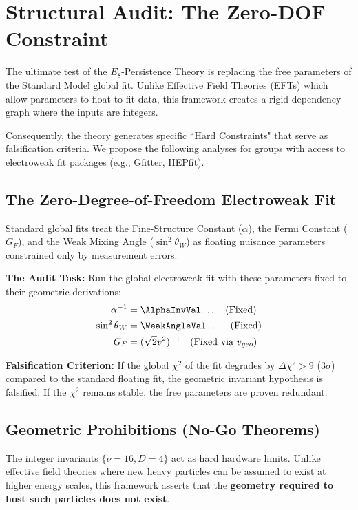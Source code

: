 \section{Structural Audit: The Zero-DOF Constraint}

The ultimate test of the $E_8$-Persistence Theory is replacing the free parameters of the Standard Model global fit. Unlike Effective Field Theories (EFTs) which allow parameters to float to fit data, this framework creates a rigid dependency graph where the inputs are integers.

Consequently, the theory generates specific ``Hard Constraints" that serve as falsification criteria. We propose the following analyses for groups with access to electroweak fit packages (e.g., Gfitter, HEPfit).

\subsection{The Zero-Degree-of-Freedom Electroweak Fit}

Standard global fits treat the Fine-Structure Constant ($\alpha$), the Fermi Constant ($G_F$), and the Weak Mixing Angle ($\sin^2\theta_W$) as floating nuisance parameters constrained only by measurement errors.

\textbf{The Audit Task:} Run the global electroweak fit with these parameters fixed to their geometric derivations:
\begin{align}
\alpha^{-1} &= \AlphaInvVal \dots \quad (\text{Fixed}) \\
\sin^2 \theta_W &= \WeakAngleVal \dots \quad (\text{Fixed}) \\
G_F &= (\sqrt{2}v^2)^{-1} \quad (\text{Fixed via } v_{geo})
\end{align}

\textbf{Falsification Criterion:} If the global $\chi^2$ of the fit degrades by $\Delta\chi^2 > 9$ ($3\sigma$) compared to the standard floating fit, the geometric invariant hypothesis is falsified. If the $\chi^2$ remains stable, the free parameters are proven redundant.


\subsection{Geometric Prohibitions (No-Go Theorems)}

The integer invariants $\{\nu=16, D=4\}$ act as hard hardware limits. Unlike effective field theories where new heavy particles can be assumed to exist at higher energy scales, this framework asserts that the \textbf{geometry required to host such particles does not exist}.

